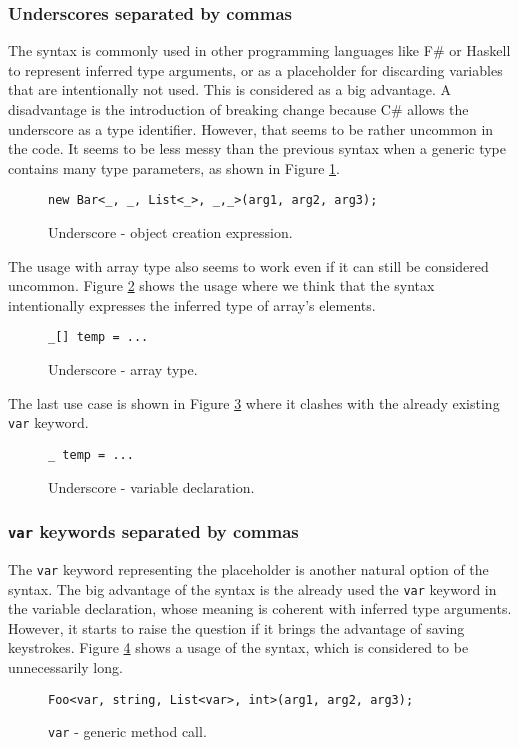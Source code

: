 \subsubsection{Underscores separated by commas} 

The syntax is commonly used in other programming languages like F\# or Haskell to represent inferred type arguments, or as a placeholder for discarding variables that are intentionally not used. 
This is considered as a big advantage. 
A disadvantage is the introduction of breaking change because C\# allows the underscore as a type identifier. 
However, that seems to be rather uncommon in the code. 
It seems to be less messy than the previous syntax when a generic type contains many type parameters, as shown in Figure \ref{img50:opU1}.
\begin{figure}[h!]
\begin{lstlisting}[style=csharp]
new Bar<_, _, List<_>, _,_>(arg1, arg2, arg3);
\end{lstlisting}
\caption{Underscore - object creation expression.}
\label{img50:opU1}
\end{figure}
\par
The usage with array type also seems to work even if it can still be considered uncommon. 
Figure \ref{img51:opU4} shows the usage where we think that the syntax intentionally expresses the inferred type of array’s elements.
\begin{figure}[h!]
\begin{lstlisting}[style=csharp]
_[] temp = ...
\end{lstlisting}
\caption{Underscore - array type.}
\label{img51:opU4}
\end{figure}
\par
The last use case is shown in Figure \ref{img52:opU5} where it clashes with the already existing \texttt{var} keyword.
\begin{figure}[h!]
\begin{lstlisting}[style=csharp]
_ temp = ...
\end{lstlisting}
\caption{Underscore - variable declaration.}
\label{img52:opU5}
\end{figure}


\subsubsection{\texttt{var} keywords separated by commas} 

The \texttt{var} keyword representing the placeholder is another natural option of the syntax. 
The big advantage of the syntax is the already used the \texttt{var} keyword in the variable declaration, whose meaning is coherent with inferred type arguments. 
However, it starts to raise the question if it brings the advantage of saving keystrokes. 
Figure \ref{img52:opV1} shows a usage of the syntax, which is considered to be unnecessarily long.
\begin{figure}[h!]
\begin{lstlisting}[style=csharp]
Foo<var, string, List<var>, int>(arg1, arg2, arg3);
\end{lstlisting}
\caption{\texttt{var} - generic method call.}
\label{img52:opV1}
\end{figure}

